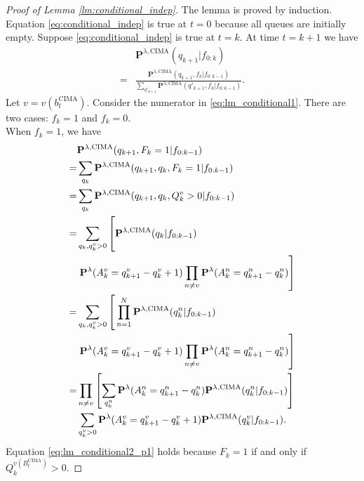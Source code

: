 \documentclass[onecolumn,draftcls]{IEEEtran}
\newcommand{\g}{\text{CIMA}}
\begin{document}
\appendices
\section{}
\label{app:lm1}
\begin{proof}[Proof of Lemma \ref{lm:conditional_indep}]
The lemma is proved by induction.
Equation \eqref{eq:conditional_indep} is true at $t=0$ because all queues are initially empty.
Suppose \eqref{eq:conditional_indep} is true at $t=k$. At time $t=k+1$ we have
\begin{align}
&\mathbf{P}^{\lambda,\g}(q_{k+1}|f_{0:k})\nonumber\\
= &
\frac{\mathbf{P}^{\lambda,\g}(q_{k+1}, f_k|f_{0:k-1})}{\sum_{q'_{k+1}}\mathbf{P}^{\lambda,\g}(q'_{k+1},f_k|f_{0:k-1}) }.
\label{eq:lm_conditional1}
\end{align}
Let $v = v(b^{\g}_t)$.
Consider the numerator in \eqref{eq:lm_conditional1}. There are two cases: $f_k = 1$ and $f_k = 0$.
\\
When $f_k = 1$, we have
\begin{align}
&\mathbf{P}^{\lambda,\g}(q_{k+1}, F_k=1|f_{0:k-1})\nonumber\\
= &\sum_{q_k}
\mathbf{P}^{\lambda,\g}(q_{k+1},q_{k}, F_k=1|f_{0:k-1})\nonumber\\
= &\sum_{q_k}
\mathbf{P}^{\lambda,\g}(q_{k+1},q_{k}, Q^{v}_{k}>0|f_{0:k-1})\label{eq:lm_conditional2_p1}\\
= &\sum_{q_k, q^{v}_{k}>0}
\left[\vphantom{\prod_{n\neq v}} \mathbf{P}^{\lambda,\g}(q_{k}|f_{0:k-1})\right.\nonumber\\
&\left.
\mathbf{P}^{\lambda}(A^v_k = q^v_{k+1}-q^v_{k}+1)\prod_{n\neq v}\mathbf{P}^{\lambda}(A^n_k = q^n_{k+1}-q^n_{k}) \right]
\label{eq:lm_conditional2_p2}\\
= &\sum_{q_k, q^{v}_{k}>0}
\left[\vphantom{\prod_{n\neq v}} \prod_{n =1}^N \mathbf{P}^{\lambda,\g}(q^n_{k}|f_{0:k-1})\right.\nonumber\\
&\left.
\mathbf{P}^{\lambda}(A^v_k = q^v_{k+1}-q^v_{k}+1)\prod_{n\neq v}\mathbf{P}^{\lambda}(A^n_k = q^n_{k+1}-q^n_{k}) \right]
\label{eq:lm_conditional2_p3}\\
= 
&\prod_{n\neq v}\left[\sum_{q^n_k}\mathbf{P}^{\lambda}(A^n_k = q^n_{k+1}-q^n_{k})\mathbf{P}^{\lambda,\g}(q^n_{k}|f_{0:k-1}) \right]
\nonumber\\
&
\sum_{q^{v}_{k}>0}\mathbf{P}^{\lambda}(A^v_k = q^v_{k+1}-q^v_{k}+1)
\mathbf{P}^{\lambda,\g}(q^v_{k}|f_{0:k-1}).
\label{eq:lm_conditional2}
\end{align}
Equation \eqref{eq:lm_conditional2_p1} holds because $F_k = 1$ if and only if $Q^{v(B^{\g}_t)}_{k}>0$.

\end{proof}
\end{document}
